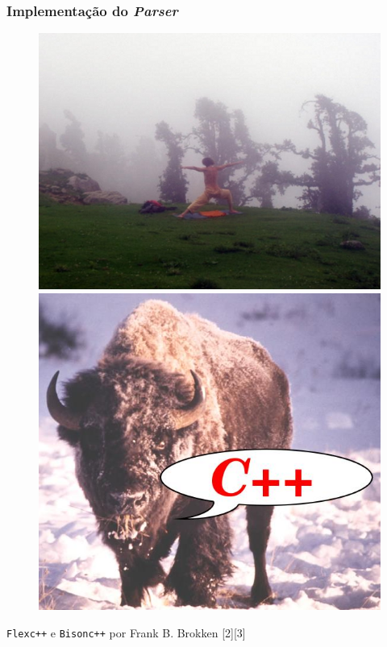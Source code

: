 \documentclass[brazil]{beamer}
\begin{document}
\begin{frame}[fragile]
  \frametitle{Implementação do \textit{Parser}}
  \pause
  \vspace{-1em}
  \begin{figure}
    \includegraphics[width=.4\textwidth]{images/flex.jpg}
    \pause
    \includegraphics[width=.4\textwidth]{images/bison.jpg}
  \end{figure}
  \pause
  \begin{center}
    \texttt{Flexc++} e \texttt{Bisonc++} por Frank B. Brokken [2][3]
  \end{center}
\end{frame}
\end{document}
